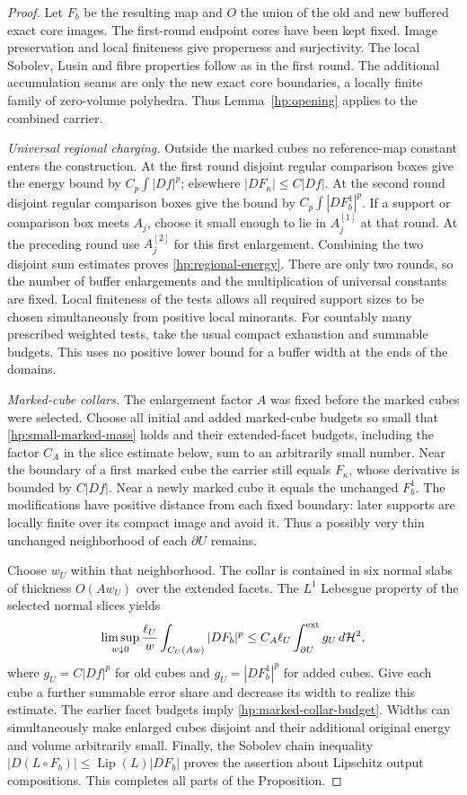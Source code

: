 \documentclass[11pt]{article}
\numberwithin{equation}{section}
\theoremstyle{definition}
\theoremstyle{remark}
\begin{document}
\begin{proof}
Let $F_b$ be the resulting map and $O$ the union of the old and new
buffered exact core images.  The first-round endpoint cores have
been kept fixed.  Image preservation and local finiteness give
properness and surjectivity.  The local Sobolev, Lusin and fibre
properties follow as in the first round.  The additional
accumulation seams are only the new exact core boundaries, a locally
finite family of zero-volume polyhedra.  Thus
Lemma~\ref{hp:opening} applies to the combined carrier.

\emph{Universal regional charging.}
Outside the marked cubes no reference-map constant enters the
construction.  At the first round disjoint regular comparison boxes
give the energy bound by $C_p\int|Df|^p$; elsewhere
$|DF_\kappa|\leq C|Df|$.  At the second round disjoint regular
comparison boxes give the bound by $C_p\int|DF_b^1|^p$.
If a support or comparison box meets $A_j$, choose it small enough
to lie in $A_j^{[1]}$ at that round.  At the preceding round use
$A_j^{[2]}$ for this first enlargement.  Combining the two disjoint
sum estimates proves \eqref{hp:regional-energy}.  There are only two
rounds, so the number of buffer enlargements and the multiplication
of universal constants are fixed.  Local finiteness of the tests
allows all required support sizes to be chosen simultaneously from
positive local minorants.  For countably many prescribed weighted
tests, take the usual compact exhaustion and summable budgets.
This uses no positive lower bound for a buffer width at the ends
of the domains.

\emph{Marked-cube collars.}
The enlargement factor $A$ was fixed before the marked cubes were
selected.  Choose all initial and added marked-cube budgets so small
that \eqref{hp:small-marked-mass} holds and their extended-facet budgets,
including the factor $C_A$ in the slice estimate below, sum to an
arbitrarily small number.  Near the boundary of a first
marked cube the carrier still equals $F_\kappa$, whose derivative
is bounded by $C|Df|$.  Near a newly marked cube it equals the
unchanged $F_b^1$.  The modifications have positive distance from
each fixed boundary: later supports are locally finite over its
compact image and avoid it.  Thus a possibly very thin unchanged
neighborhood of each $\partial U$ remains.

Choose $w_U$ within that neighborhood.  The collar is contained in
six normal slabs of thickness $O(Aw_U)$ over the extended facets.
The $L^1$ Lebesgue property of the selected normal slices yields
\[
 \limsup_{w\downarrow0}\frac{\ell_U}{w}
       \int_{C_U(Aw)}|DF_b|^p
 \leq C_A\ell_U\int_{\partial U}^{\rm ext}g_U\,d\mathcal H^2,
\]
where $g_U=C|Df|^p$ for old cubes and
$g_U=|DF_b^1|^p$ for added cubes.  Give each cube a further summable
error share and decrease its width to realize this estimate.  The
earlier facet budgets imply \eqref{hp:marked-collar-budget}.
Widths can simultaneously make enlarged cubes disjoint and their
additional original energy and volume arbitrarily small.  Finally,
the Sobolev chain inequality
$|D(L\circ F_b)|\leq\operatorname{Lip}(L)|DF_b|$ proves the assertion about
Lipschitz output compositions.  This completes all parts of the
Proposition.
\end{proof}
\end{document}

